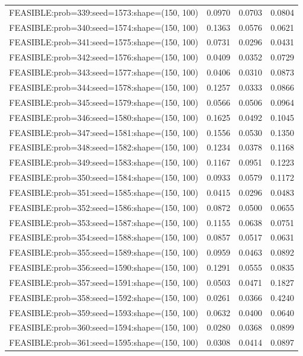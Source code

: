 \begin{longtable}{lccc}
FEASIBLE:prob=339:seed=1573:shape=(150, 100) & 0.0970 & 0.0703 & 0.0804 \\
FEASIBLE:prob=340:seed=1574:shape=(150, 100) & 0.1363 & 0.0576 & 0.0621 \\
FEASIBLE:prob=341:seed=1575:shape=(150, 100) & 0.0731 & 0.0296 & 0.0431 \\
FEASIBLE:prob=342:seed=1576:shape=(150, 100) & 0.0409 & 0.0352 & 0.0729 \\
FEASIBLE:prob=343:seed=1577:shape=(150, 100) & 0.0406 & 0.0310 & 0.0873 \\
FEASIBLE:prob=344:seed=1578:shape=(150, 100) & 0.1257 & 0.0333 & 0.0866 \\
FEASIBLE:prob=345:seed=1579:shape=(150, 100) & 0.0566 & 0.0506 & 0.0964 \\
FEASIBLE:prob=346:seed=1580:shape=(150, 100) & 0.1625 & 0.0492 & 0.1045 \\
FEASIBLE:prob=347:seed=1581:shape=(150, 100) & 0.1556 & 0.0530 & 0.1350 \\
FEASIBLE:prob=348:seed=1582:shape=(150, 100) & 0.1234 & 0.0378 & 0.1168 \\
FEASIBLE:prob=349:seed=1583:shape=(150, 100) & 0.1167 & 0.0951 & 0.1223 \\
FEASIBLE:prob=350:seed=1584:shape=(150, 100) & 0.0933 & 0.0579 & 0.1172 \\
FEASIBLE:prob=351:seed=1585:shape=(150, 100) & 0.0415 & 0.0296 & 0.0483 \\
FEASIBLE:prob=352:seed=1586:shape=(150, 100) & 0.0872 & 0.0500 & 0.0655 \\
FEASIBLE:prob=353:seed=1587:shape=(150, 100) & 0.1155 & 0.0638 & 0.0751 \\
FEASIBLE:prob=354:seed=1588:shape=(150, 100) & 0.0857 & 0.0517 & 0.0631 \\
FEASIBLE:prob=355:seed=1589:shape=(150, 100) & 0.0959 & 0.0463 & 0.0892 \\
FEASIBLE:prob=356:seed=1590:shape=(150, 100) & 0.1291 & 0.0555 & 0.0835 \\
FEASIBLE:prob=357:seed=1591:shape=(150, 100) & 0.0503 & 0.0471 & 0.1827 \\
FEASIBLE:prob=358:seed=1592:shape=(150, 100) & 0.0261 & 0.0366 & 0.4240 \\
FEASIBLE:prob=359:seed=1593:shape=(150, 100) & 0.0632 & 0.0400 & 0.0640 \\
FEASIBLE:prob=360:seed=1594:shape=(150, 100) & 0.0280 & 0.0368 & 0.0899 \\
FEASIBLE:prob=361:seed=1595:shape=(150, 100) & 0.0308 & 0.0414 & 0.0897 \\

\end{longtable}
